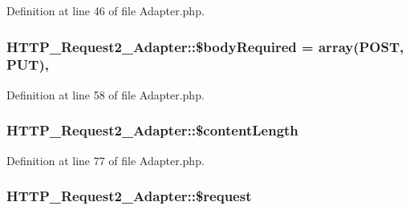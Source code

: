 Definition at line 46 of file Adapter.\+php.

\hypertarget{classHTTP__Request2__Adapter_a1c84e4f08fed2fdd4511ea12bf479595}{}
\subsubsection[{\$body\+Required}]{\setlength{\rightskip}{0pt plus 5cm}H\+T\+T\+P\+\_\+\+Request2\+\_\+\+Adapter\+::\$body\+Required = array(\textquotesingle{}P\+O\+S\+T\textquotesingle{}, \textquotesingle{}P\+U\+T\textquotesingle{})\hspace{0.3cm}{\ttfamily [static]}, {\ttfamily [protected]}}\label{classHTTP__Request2__Adapter_a1c84e4f08fed2fdd4511ea12bf479595}


Definition at line 58 of file Adapter.\+php.

\hypertarget{classHTTP__Request2__Adapter_ac8dc7108f1d54ec9b94224f57577cc3e}{}
\subsubsection[{\$content\+Length}]{\setlength{\rightskip}{0pt plus 5cm}H\+T\+T\+P\+\_\+\+Request2\+\_\+\+Adapter\+::\$content\+Length\hspace{0.3cm}{\ttfamily [protected]}}\label{classHTTP__Request2__Adapter_ac8dc7108f1d54ec9b94224f57577cc3e}


Definition at line 77 of file Adapter.\+php.

\hypertarget{classHTTP__Request2__Adapter_ad7df680c105146f9fdd4b386220be914}{}
\subsubsection[{\$request}]{\setlength{\rightskip}{0pt plus 5cm}H\+T\+T\+P\+\_\+\+Request2\+\_\+\+Adapter\+::\$request\hspace{0.3cm}{\ttfamily [protected]}}\label{classHTTP__Request2__Adapter_ad7df680c105146f9fdd4b386220be914}



